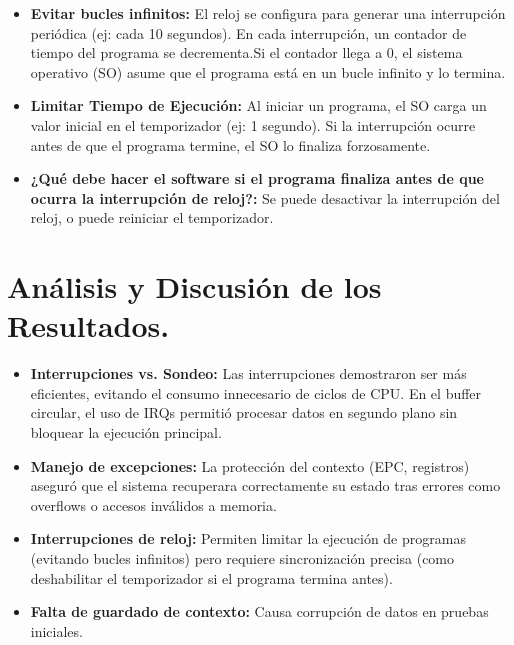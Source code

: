 \documentclass{article}
\begin{document}
\begin{itemize}
    \item \textbf{Evitar bucles infinitos: }El reloj se configura para generar una interrupción periódica (ej: cada 10 segundos). En cada interrupción, un contador de tiempo del programa se decrementa.Si el contador llega a 0, el sistema operativo (SO) asume que el programa está en un bucle infinito y lo termina.

    \item \textbf{Limitar Tiempo de Ejecución: }Al iniciar un programa, el SO carga un valor inicial en el temporizador (ej: 1 segundo). Si la interrupción ocurre antes de que el programa termine, el SO lo finaliza forzosamente.

    \item \textbf{¿Qué debe hacer el software si el programa finaliza antes de que ocurra la interrupción de reloj?: }Se puede desactivar la interrupción del reloj, o puede reiniciar el temporizador.
\end{itemize}

\section*{Análisis y Discusión de los Resultados.}

\begin{itemize}
    \item \textbf{Interrupciones vs. Sondeo: }Las interrupciones demostraron ser más eficientes, evitando el consumo innecesario de ciclos de CPU. En el buffer circular, el uso de IRQs permitió procesar datos en segundo plano sin bloquear la ejecución principal.
    \item \textbf{Manejo de excepciones: }La protección del contexto (EPC, registros) aseguró que el sistema recuperara correctamente su estado tras errores como overflows o accesos inválidos a memoria.
    \item \textbf{Interrupciones de reloj: }Permiten limitar la ejecución de programas (evitando bucles infinitos) pero requiere sincronización precisa (como deshabilitar el temporizador si el programa termina antes).
    \item \textbf{Falta de guardado de contexto: }Causa corrupción de datos en pruebas iniciales.
\end{itemize}
\end{document}
